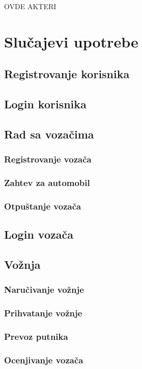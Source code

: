 \documentclass{article}
\begin{document}
OVDE AKTERI

\section{\bfseries Slu\v cajevi upotrebe}

\subsection{\bfseries Registrovanje korisnika}
\subsection{\bfseries Login korisnika}
\subsection{\bfseries Rad sa voza\v cima}
\subsubsection{\bfseries Registrovanje voza\v ca}
\subsubsection{\bfseries Zahtev za automobil}
\subsubsection{\bfseries Otpu\v stanje voza\v ca}
\subsection{\bfseries Login voza\v ca}
\subsection{\bfseries Vo\v znja}
\subsubsection{\bfseries Naru\v civanje vo\v znje}
\subsubsection{\bfseries Prihvatanje vo\v znje}
\subsubsection{\bfseries Prevoz putnika}
\subsubsection{\bfseries Ocenjivanje voza\v ca}
\end{document}
